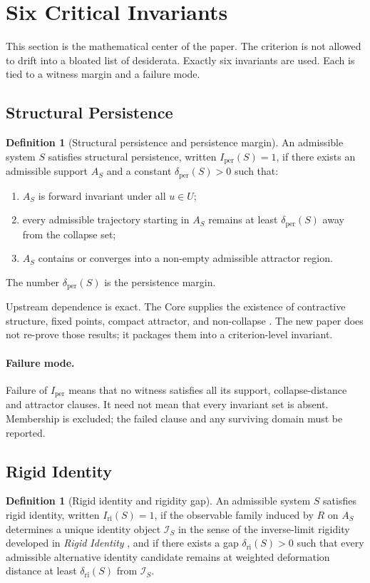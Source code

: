\documentclass[11pt,a4paper]{article}
\theoremstyle{definition}
\newtheorem{definition}[theorem]{Definition}
\newcommand{\Iper}{I_{\mathrm{per}}}
\newcommand{\Iri}{I_{\mathrm{ri}}}
\newcommand{\Aset}{A_S}
\newcommand{\Id}{\mathcal{I}}
\begin{document}
\section{Six Critical Invariants}
This section is the mathematical center of the paper. The criterion is not allowed to drift into a bloated list of desiderata. Exactly six invariants are used. Each is tied to a witness margin and a failure mode.

\subsection{Structural Persistence}
\begin{definition}[Structural persistence and persistence margin]\label{def:iper}
An admissible system $S$ satisfies structural persistence, written $\Iper(S)=1$, if there exists an admissible support $\Aset$ and a constant $\delta_{\mathrm{per}}(S) > 0$ such that:
\begin{enumerate}[leftmargin=1.5em]
\item $\Aset$ is forward invariant under all $u \in U$;
\item every admissible trajectory starting in $\Aset$ remains at least $\delta_{\mathrm{per}}(S)$ away from the collapse set;
\item $\Aset$ contains or converges into a non-empty admissible attractor region.
\end{enumerate}
The number $\delta_{\mathrm{per}}(S)$ is the persistence margin.
\end{definition}

Upstream dependence is exact. The Core supplies the existence of contractive structure, fixed points, compact attractor, and non-collapse \cite{core}. The new paper does not re-prove those results; it packages them into a criterion-level invariant.

\paragraph{Failure mode.}
Failure of $\Iper$ means that no witness satisfies all its support, collapse-distance and attractor clauses. It need not mean that every invariant set is absent. Membership is excluded; the failed clause and any surviving domain must be reported.

\subsection{Rigid Identity}
\begin{definition}[Rigid identity and rigidity gap]\label{def:iri}
An admissible system $S$ satisfies rigid identity, written $\Iri(S)=1$, if the observable family induced by $R$ on $\Aset$ determines a unique identity object $\Id_S$ in the sense of the inverse-limit rigidity developed in \textit{Rigid Identity} \cite{paper1}, and if there exists a gap $\delta_{\mathrm{ri}}(S) > 0$ such that every admissible alternative identity candidate remains at weighted deformation distance at least $\delta_{\mathrm{ri}}(S)$ from $\Id_S$.
\end{definition}
\end{document}
